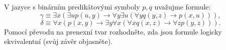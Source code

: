 V jazyce s binárním predikátovými symboly $p,q$ uvažujme formule:
$$\gamma \equiv \exists x(\exists up(u,y)\rightarrow \forall y \exists u(\forall yq(y,z)\rightarrow p(x,u))),$$
$$\delta \equiv \forall x (p(x,y)\rightarrow \exists y \forall x (\forall x q (x,z)\rightarrow \forall z p (y,z))).$$
Pomocí převodu na prenexní tvar rozhodněte, zda jsou formule logicky
ekvivalentní (svůj závěr objasněte).
